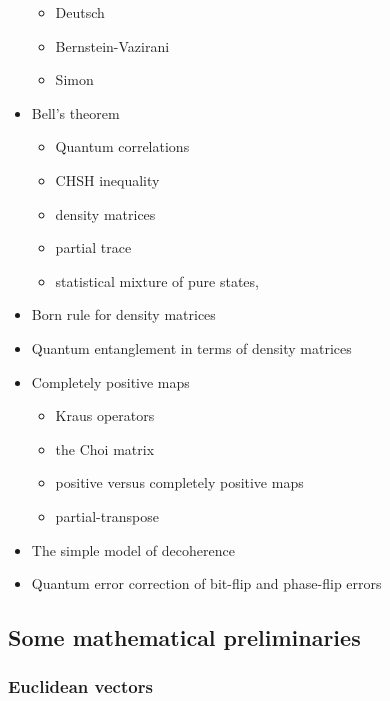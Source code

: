 \documentclass[fleqn]{article}
\providecommand{\tightlist}{%
  \setlength{\itemsep}{0pt}\setlength{\parskip}{0pt}}
\begin{document}
\begin{itemize}
  \begin{itemize}
  \tightlist
  \item
    Deutsch
  \item
    Bernstein-Vazirani
  \item
    Simon
  \end{itemize}
\item
  Bell's theorem

  \begin{itemize}
  \tightlist
  \item
    Quantum correlations
  \item
    CHSH inequality
  \item
    density matrices
  \item
    partial trace
  \item
    statistical mixture of pure states,
  \end{itemize}
\item
  Born rule for density matrices
\item
  Quantum entanglement in terms of density matrices
\item
  Completely positive maps

  \begin{itemize}
  \tightlist
  \item
    Kraus operators
  \item
    the Choi matrix
  \item
    positive versus completely positive maps
  \item
    partial-transpose
  \end{itemize}
\item
  The simple model of decoherence
\item
  Quantum error correction of bit-flip and phase-flip errors
\end{itemize}

\hypertarget{some-mathematical-preliminaries}{%
\subsection{Some mathematical preliminaries}\label{some-mathematical-preliminaries}}

\hypertarget{euclidean-vectors}{%
\subsubsection{Euclidean vectors}\label{euclidean-vectors}}
\end{document}
